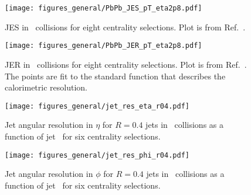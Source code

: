 \begin{figure}
   \centering
   \texttt{[image: figures\_general/PbPb\_JES\_pT\_eta2p8.pdf]}
   \caption{ JES in \pbpb\ collisions for eight centrality selections.  Plot is from Ref.~\cite{PbPbRaaNote}.}
   \label{Fig:PerformancepbpbJES}
\end{figure}

\begin{figure}
   \centering
   \texttt{[image: figures\_general/PbPb\_JER\_pT\_eta2p8.pdf]}
   \caption{ JER in \pbpb\ collisions for eight centrality selections.  Plot is from Ref.~\cite{PbPbRaaNote}. The points are fit to the standard function that describes the calorimetric resolution.}
   \label{Fig:PerformancepbpbJER}
\end{figure}


\begin{figure}
   \centering
   \texttt{[image: figures\_general/jet\_res\_eta\_r04.pdf]}
   \caption{ Jet angular resolution in $\eta$ for $R=0.4$ jets in \pbpb\ collisions as a function of jet \pT\ for six centrality selections.}
   \label{Fig:PerformancepbpbJPReta0p4}
\end{figure}

\begin{figure}
   \centering
   \texttt{[image: figures\_general/jet\_res\_phi\_r04.pdf]}
   \caption{ Jet angular resolution in $\phi$ for $R=0.4$ jets in \pbpb\ collisions as a function of jet \pT\ for six centrality selections.}
   \label{Fig:PerformancepbpbJPRphi0p4}
\end{figure}

%
